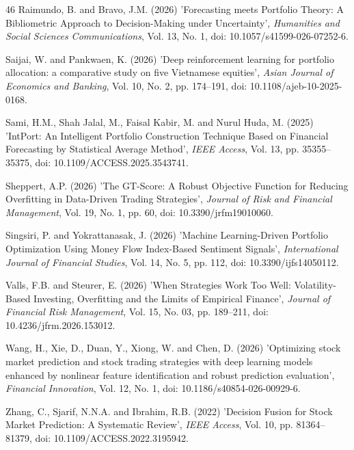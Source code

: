 \documentclass{singlecol-new}
\theoremstyle{TH}{
\newtheorem{lemma}{Lemma}
\newtheorem{theorem}[lemma]{Theorem}
\newtheorem{corrolary}[lemma]{Corrolary}
\newtheorem{conjecture}[lemma]{Conjecture}
\newtheorem{proposition}[lemma]{Proposition}
\newtheorem{claim}[lemma]{Claim}
\newtheorem{stheorem}[lemma]{Wrong Theorem}
\newtheorem{algorithm}{Algorithm}
}
\theoremstyle{THrm}{
\newtheorem{definition}{Definition}[section]
\newtheorem{question}{Question}[section]
\newtheorem{remark}{Remark}
\newtheorem{scheme}{Scheme}
}
\theoremstyle{THhit}{
\newtheorem{case}{Case}[section]
}
\begin{document}
\begin{thebibliography}{46}
Raimundo, B. and Bravo, J.M. (2026) 'Forecasting meets Portfolio Theory: A Bibliometric Approach to Decision-Making under Uncertainty', {\it Humanities and Social Sciences Communications}, Vol. 13, No. 1, doi: 10.1057/s41599-026-07252-6.

Saijai, W. and Pankwaen, K. (2026) 'Deep reinforcement learning for portfolio allocation: a comparative study on five Vietnamese equities', {\it Asian Journal of Economics and Banking}, Vol. 10, No. 2, pp. 174--191, doi: 10.1108/ajeb-10-2025-0168.

Sami, H.M., Shah Jalal, M., Faisal Kabir, M. and Nurul Huda, M. (2025) 'IntPort: An Intelligent Portfolio Construction Technique Based on Financial Forecasting by Statistical Average Method', {\it IEEE Access}, Vol. 13, pp. 35355--35375, doi: 10.1109/ACCESS.2025.3543741.

Sheppert, A.P. (2026) 'The GT-Score: A Robust Objective Function for Reducing Overfitting in Data-Driven Trading Strategies', {\it Journal of Risk and Financial Management}, Vol. 19, No. 1, pp. 60, doi: 10.3390/jrfm19010060.

Singsiri, P. and Yokrattanasak, J. (2026) 'Machine Learning-Driven Portfolio Optimization Using Money Flow Index-Based Sentiment Signals', {\it International Journal of Financial Studies}, Vol. 14, No. 5, pp. 112, doi: 10.3390/ijfs14050112.

Valls, F.B. and Steurer, E. (2026) 'When Strategies Work Too Well: Volatility-Based Investing, Overfitting and the Limits of Empirical Finance', {\it Journal of Financial Risk Management}, Vol. 15, No. 03, pp. 189--211, doi: 10.4236/jfrm.2026.153012.

Wang, H., Xie, D., Duan, Y., Xiong, W. and Chen, D. (2026) 'Optimizing stock market prediction and stock trading strategies with deep learning models enhanced by nonlinear feature identification and robust prediction evaluation', {\it Financial Innovation}, Vol. 12, No. 1, doi: 10.1186/s40854-026-00929-6.

Zhang, C., Sjarif, N.N.A. and Ibrahim, R.B. (2022) 'Decision Fusion for Stock Market Prediction: A Systematic Review', {\it IEEE Access}, Vol. 10, pp. 81364--81379, doi: 10.1109/ACCESS.2022.3195942.


\end{thebibliography}
\end{document}
